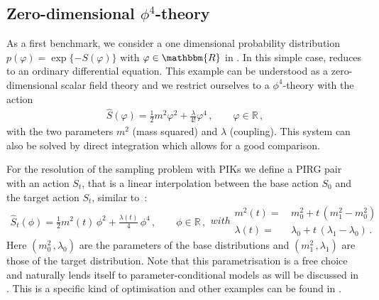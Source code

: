 \documentclass[reprint,amsmath,amssymb,aps,pra,superscriptaddress,nofootinbib,twocolumn,floatfix,nolongbibliography]{revtex4-2}
\begin{document}
\subsection{Zero-dimensional $\phi^4$-theory}
\label{sec:phi4-0D}

As a first benchmark, we consider a one dimensional probability distribution $p(\varphi)= \exp\{-S(\varphi)\} $ with $\varphi \in \mathbbm{R}$ in . In this simple case,  reduces to an ordinary differential equation. This example can be understood as a zero-dimensional scalar field theory and we restrict ourselves to a $\phi^4$-theory with the action 
%
\begin{align} 
\hat S(\varphi) =\frac12 m^2 \varphi^2 +\frac{\lambda}{4!} \varphi^4\,, \qquad \varphi \in \mathds{R}\,,
\label{eq:Svarphi0d}
\end{align} 
%
with the two parameters $m^2$ (mass squared) and $\lambda$ (coupling). This system can also be solved by direct integration which allows for a good comparison. 

For the resolution of the sampling problem with PIKs we define a PIRG pair with an action $S_t$, that is a linear interpolation between the base action $S_0$ and the target action $S_t$, similar to~\cite{Wu:2020snf}:
%
\begin{subequations} 
	\label{eq:Std=0}
\begin{align}
    \hat{S}_t(\phi) = \frac{1}{2} m^2(t) \,\phi^2 + \frac{\lambda(t)}{4}\, \phi^4\,, \qquad \phi \in \mathds{R}\,,
    \label{eq:ZeroDimensionalAction}
\end{align}
%
with 
%
\begin{align}\nonumber 
		m^2(t) =&\, m_0^2 + t\,\left( m_1^2 - m_0^2\right) \\
		\lambda(t) = &\, \lambda_0 + t\,\left( \lambda_1 - \lambda_0\right)\,. 
	\label{eq:CouplingParametrisation}
\end{align}
%
\end{subequations} 
%
Here $(m_0^2\, , \lambda_0)$ are the parameters of the base distributions and $(m_1^2\, ,\lambda_1)$ are those of the target distribution. Note that this parametrisation is a free choice and naturally lends itself to parameter-conditional models as will be discussed in . This is a specific kind of optimisation and other examples can be found in .
\end{document}

